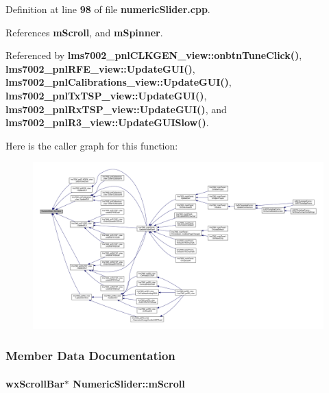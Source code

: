 Definition at line {\bf 98} of file {\bf numeric\+Slider.\+cpp}.



References {\bf m\+Scroll}, and {\bf m\+Spinner}.



Referenced by {\bf lms7002\+\_\+pnl\+C\+L\+K\+G\+E\+N\+\_\+view\+::onbtn\+Tune\+Click()}, {\bf lms7002\+\_\+pnl\+R\+F\+E\+\_\+view\+::\+Update\+G\+U\+I()}, {\bf lms7002\+\_\+pnl\+Calibrations\+\_\+view\+::\+Update\+G\+U\+I()}, {\bf lms7002\+\_\+pnl\+Tx\+T\+S\+P\+\_\+view\+::\+Update\+G\+U\+I()}, {\bf lms7002\+\_\+pnl\+Rx\+T\+S\+P\+\_\+view\+::\+Update\+G\+U\+I()}, and {\bf lms7002\+\_\+pnl\+R3\+\_\+view\+::\+Update\+G\+U\+I\+Slow()}.



Here is the caller graph for this function\+:
\nopagebreak
\begin{figure}[H]
\begin{center}
\leavevmode
\includegraphics[width=350pt]{d9/d45/classNumericSlider_a0c9f6f7ee5094965dadff426c4fae258_icgraph}
\end{center}
\end{figure}




\subsubsection{Member Data Documentation}
\paragraph[{m\+Scroll}]{\setlength{\rightskip}{0pt plus 5cm}wx\+Scroll\+Bar$\ast$ Numeric\+Slider\+::m\+Scroll\hspace{0.3cm}{\ttfamily [protected]}}\label{classNumericSlider_ab88a498e11cf3c5962c53bb061d50937}


